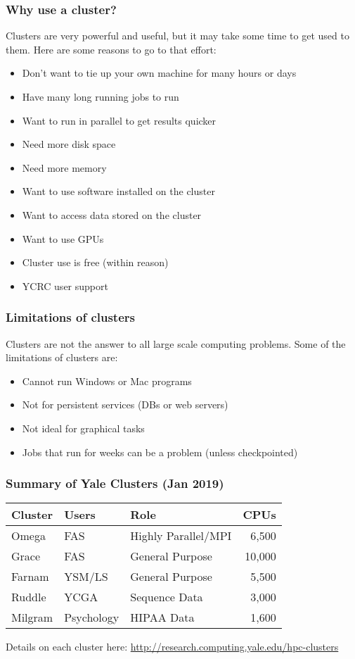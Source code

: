\documentclass[10pt]{beamer}
\newcommand\regfont{\fontsize{10pt}{7.2}\selectfont}
\begin{document}
\begin{frame}
\frametitle{Why use a cluster?}
Clusters are very powerful and useful, but it may take some
time to get used to them.
Here are some reasons to go to that effort:

\begin{itemize}
\item Don't want to tie up your own machine for many hours or days
\item Have many long running jobs to run
\item Want to run in parallel to get results quicker
\item Need more disk space
\item Need more memory
\item Want to use software installed on the cluster
\item Want to access data stored on the cluster
\item Want to use GPUs
\item Cluster use is free (within reason)
\item YCRC user support
\end{itemize}
\end{frame}

\begin{frame}
\frametitle{Limitations of clusters}
Clusters are not the answer to all large scale computing problems.
Some of the limitations of clusters are:

\begin{itemize}
\item Cannot run Windows or Mac programs
\item Not for persistent services (DBs or web servers)
\item Not ideal for graphical tasks
\item Jobs that run for weeks can be a problem (unless checkpointed)
\end{itemize}
\end{frame}

\begin{frame}[fragile]
\frametitle{Summary of Yale Clusters (Jan 2019)}
\begin{tabular}{|l|l|l|r|}
\textbf{Cluster} & \bf{Users} & \textbf{Role} & \textbf{CPUs} \\
\hline
Omega & FAS & Highly Parallel/MPI & 6,500 \\ 
Grace & FAS & General Purpose & 10,000 \\
Farnam & YSM/LS & General Purpose & 5,500 \\
Ruddle & YCGA & Sequence Data & 3,000 \\ 
Milgram & Psychology & HIPAA Data & 1,600 \\
\end{tabular}
\regfont
\vskip 10pt
Details on each cluster here:
\vskip 5pt
\url{http://research.computing.yale.edu/hpc-clusters}

\end{frame}
\end{document}
